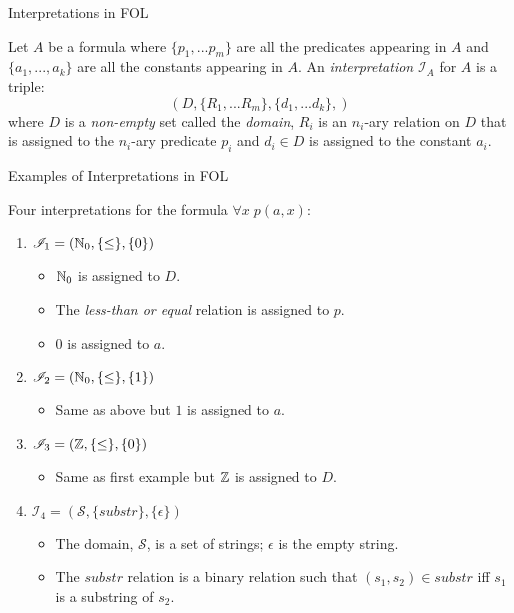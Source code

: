 \documentclass[style=sailor,size=12pt]{powerdot}
\begin{document}
\begin{wideslide}[bm=,toc=]{Interpretations in FOL}
\begin{defn}{7.16}
Let $A$ be a formula where $\{p_1,...p_m\}$ are all the predicates
appearing in $A$ and $\{a_1,...,a_k\}$ are all the constants appearing in $A$.
An \emph{interpretation} $\mathcal{I}_A$ for $A$ is a triple:
\[(D,\{R_1,...R_m\}, \{d_1,...d_k\},)\]
where $D$ is a \emph{non-empty} set called the \emph{domain}, $R_i$ is an
$n_i$-ary relation on $D$ that is assigned to the $n_i$-ary predicate
$p_i$ and $d_i \in D$ is assigned to the constant $a_i$.
\end{defn}
\end{wideslide}
\begin{wideslide}[bm=,toc=]{Examples of Interpretations in FOL}
\begin{ex}{7.17}
Four interpretations for the formula $\forall x \; p(a,x)$:
\end{ex}
\vspace*{-2ex}
\begin{enumerate}
\item<2-> $\mathcal{I}_1 = (\mathbb{N}_0,\{\leq\},\{0\})$
\begin{itemize}
\item<3-> $\mathbb{N}_0$ is assigned to $D$.
\item<3-> The \emph{less-than or equal} relation is assigned to $p$.
\item<3-> $0$ is assigned to $a$.
\end{itemize}
\item<4-> $\mathcal{I}_2 = (\mathbb{N}_0,\{\leq\},\{1\})$
\begin{itemize}
\item<5-> Same as above but $1$ is assigned to $a$. 
\end{itemize}
\item<6-> $\mathcal{I}_3 = (\mathbb{Z},\{\leq\},\{0\})$
\begin{itemize}
\item<7-> Same as first example but $\mathbb{Z}$ is assigned to $D$. 
\end{itemize}
\item<8-> $\mathcal{I}_4 = (\mathcal{S},\{substr\},\{ \epsilon \})$
\begin{itemize}
\item The domain, $\mathcal{S}$, is a set of strings; $\epsilon$ is the empty string.
\item The $substr$ relation is a binary relation such that $(s_1,s_2) \in substr$
iff $s_1$ is a substring of $s_2$.
\end{itemize}

\end{enumerate}
\end{wideslide}
\end{document}
